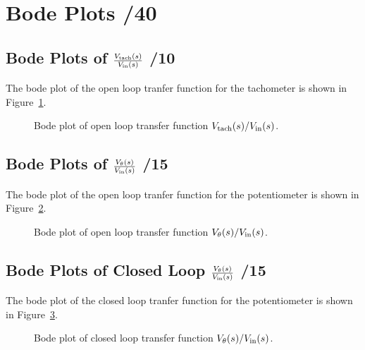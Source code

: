 \documentclass{article}
\newcommand{\score}{\hfill \underline{\hspace{1cm}}/}
\begin{document}
\section{{\sc Bode Plots} \score 40}
\subsection{Bode Plots of $\frac{V_{\rm tach}(s)}{V_{\rm in}(s)}$ \score 10}
The bode plot of the open loop tranfer function for the tachometer is shown in Figure~\ref{fig:bode41}.  

\begin{figure}[htbp]
\centering
\caption{Bode plot of open loop transfer function $V_{\rm tach}(s)/V_{\rm in}(s)$.}
\label{fig:bode41}
\end{figure}

\subsection{Bode Plots of $\frac{V_{\theta}(s)}{V_{\rm in}(s)}$ \score 15}
The bode plot of the open loop tranfer function for the potentiometer is shown in Figure~\ref{fig:bode42}.  

\begin{figure}[htbp]
\centering
\caption{Bode plot of open loop transfer function $V_{\theta}(s)/V_{\rm in}(s)$.}
\label{fig:bode42}
\end{figure}


 
\subsection{Bode Plots of Closed Loop $\frac{V_{\theta}(s)}{V_{\rm in}(s)}$ \score 15}
The bode plot of the closed loop tranfer function for the potentiometer is shown in Figure~\ref{fig:bode43}.   

\begin{figure}[htbp]
\centering
\caption{Bode plot of closed loop transfer function $V_{\theta}(s)/V_{\rm in}(s)$.}
\label{fig:bode43}
\end{figure}
\end{document}
